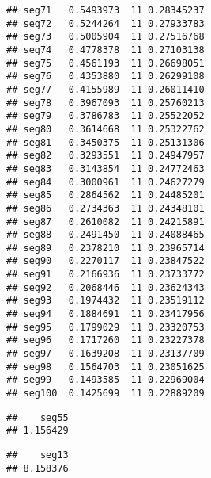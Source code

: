 \documentclass[
]{article}
\newenvironment{Shaded}{\begin{snugshade}}{\end{snugshade}}
\newcommand{\CommentTok}[1]{\textcolor[rgb]{0.56,0.35,0.01}{\textit{#1}}}
\newcommand{\FloatTok}[1]{\textcolor[rgb]{0.00,0.00,0.81}{#1}}
\newcommand{\NormalTok}[1]{#1}
\newcommand{\OperatorTok}[1]{\textcolor[rgb]{0.81,0.36,0.00}{\textbf{#1}}}
\newcommand{\StringTok}[1]{\textcolor[rgb]{0.31,0.60,0.02}{#1}}
\begin{document}
\begin{verbatim}
## seg71   0.5493973  11 0.28345237
## seg72   0.5244264  11 0.27933783
## seg73   0.5005904  11 0.27516768
## seg74   0.4778378  11 0.27103138
## seg75   0.4561193  11 0.26698051
## seg76   0.4353880  11 0.26299108
## seg77   0.4155989  11 0.26011410
## seg78   0.3967093  11 0.25760213
## seg79   0.3786783  11 0.25522052
## seg80   0.3614668  11 0.25322762
## seg81   0.3450375  11 0.25131306
## seg82   0.3293551  11 0.24947957
## seg83   0.3143854  11 0.24772463
## seg84   0.3000961  11 0.24627279
## seg85   0.2864562  11 0.24485201
## seg86   0.2734363  11 0.24348101
## seg87   0.2610082  11 0.24215891
## seg88   0.2491450  11 0.24088465
## seg89   0.2378210  11 0.23965714
## seg90   0.2270117  11 0.23847522
## seg91   0.2166936  11 0.23733772
## seg92   0.2068446  11 0.23624343
## seg93   0.1974432  11 0.23519112
## seg94   0.1884691  11 0.23417956
## seg95   0.1799029  11 0.23320753
## seg96   0.1717260  11 0.23227378
## seg97   0.1639208  11 0.23137709
## seg98   0.1564703  11 0.23051625
## seg99   0.1493585  11 0.22969004
## seg100  0.1425699  11 0.22889209
\end{verbatim}

\begin{Shaded}
\end{Shaded}

\begin{verbatim}
##    seg55 
## 1.156429
\end{verbatim}

\begin{Shaded}
\end{Shaded}

\begin{verbatim}
##    seg13 
## 8.158376
\end{verbatim}
\end{document}
